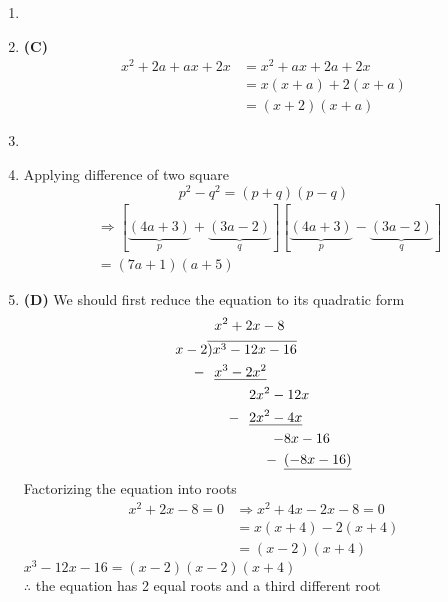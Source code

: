 \begin{multicols}{2}
\begin{enumerate}[label={\textbf{\arabic*.}}]
\item
\item \textbf{(C)}
\begin{align*}
  x^2 + 2a +ax + 2x &= x^2 + ax + 2a + 2x  \\
  & = x ( x + a ) + 2 (x + a) \\
  & = (x + 2)(x+a)
\end{align*}
\item
\item Applying difference of two square \\ \vspace{-5pt} $$p^2 - q^2 = (p + q)(p-q)$$
\begin{align*}
  &\Rightarrow [\underbrace{(4a + 3)}_{p} + \underbrace{(3a -2)}_{q} ][\underbrace{(4a + 3)}_{p} - \underbrace{(3a -2)}_{q}] \\
  & = (7a + 1)(a + 5)
\end{align*}
\item \textbf{(D)} We should first reduce the equation to its quadratic form
\begin{align*}
  & \hspace{5pt} x^2 + 2x - 8 \\
x - 2& \overline{)x^3 - 12x -16 } \\
-\hspace{2pt} & \hspace{5pt}  \underline{x^3 - 2x^2} \\
& \hspace{30pt} 2x^2 - 12x \\
- \hspace{-23pt}& \hspace{30pt} \underline{2x^2 - 4x} \\
-\hspace{-55pt} & \hspace{55pt} 8x - 16 \\
-\hspace{-50pt} & \hspace{55pt} \underline{(-8x - 16)} \\
\end{align*}
Factorizing the equation into roots
\begin{align*}
x^2 + 2x - 8 = 0 &\Rightarrow x^2 + 4x - 2x - 8 = 0 \\
& = x(x+4) -2(x+4)  \\ &= (x-2)(x+4)
\end{align*}
$x^3 - 12x -16 = (x-2)(x-2)(x+4)$ \\
$\therefore$ the equation has 2 equal roots and a third different root



\end{enumerate}
\end{multicols}
